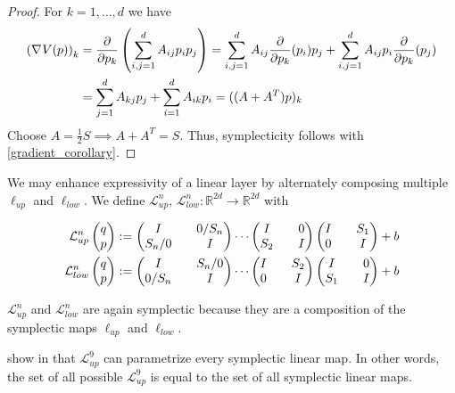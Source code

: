 \documentclass[twoside,a4paper]{article}
\begin{document}
\begin{proof}
	For $k=1, \dots, d$ we have
	\begin{align*}
		\left( \nabla_{}{V}(p) \right)_k &= \frac{\partial }{\partial p_k} \left( \sum_{i,j=1}^d A_{ij} p_i p_j \right)
		= \sum_{i,j=1}^d A_{ij} \frac{\partial }{\partial p_k}(p_i) p_j + \sum_{i,j=1}^d A_{ij} p_i \frac{\partial }{\partial p_k}(p_j) \\
		&= \sum_{j=1}^d A_{kj} p_j + \sum_{i=1}^d A_{ik} p_i = ((A+A^T)p)_k \\
	\end{align*}
	Choose $A=\frac{1}{2}S \implies A+A^T=S$.
	Thus, symplecticity follows with \cref{gradient_corollary}.
\end{proof}

We may enhance expressivity of a linear layer by alternately composing multiple
$\ell_{up}$ and $\ell_{low}$. We define 
$\mathcal{L}^{n}_{up},\, \mathcal{L}^{n}_{low} : \mathbb{R}^{2d} \to \mathbb{R}^{2d}$ with

\begin{align*}
	\mathcal{L}^{n}_{up} \begin{pmatrix} q \\ p \end{pmatrix} &:= \begin{pmatrix}
		I && 0 / S_n \\
		S_n / 0 && I
	\end{pmatrix}
	\cdots
	\begin{pmatrix}
		I && 0 \\
		S_2 && I
	\end{pmatrix}
	\begin{pmatrix}
		I && S_1 \\
		0 && I
	\end{pmatrix} + b \\
	\mathcal{L}^{n}_{low} \begin{pmatrix} q \\ p \end{pmatrix} &:= \begin{pmatrix}
		I && S_n / 0 \\
		0 / S_n && I
	\end{pmatrix}
	\cdots
	\begin{pmatrix}
		I && S_2 \\
		0 && I
	\end{pmatrix}
	\begin{pmatrix}
		I && 0 \\
		S_1 && I
	\end{pmatrix} + b
\end{align*}

$\mathcal{L}^{n}_{up}$ and $\mathcal{L}^{n}_{low}$ are again symplectic because they 
are a composition of the symplectic maps $\ell_{up}$ and $\ell_{low}$.

\citeauthor{jin2020unit} show in \cite{jin2020unit} that $\mathcal{L}^{9}_{up}$
can parametrize every symplectic linear map. In other words, 
the set of all possible $\mathcal{L}^{9}_{up}$ is equal to the set of all symplectic linear maps.
\end{document}

